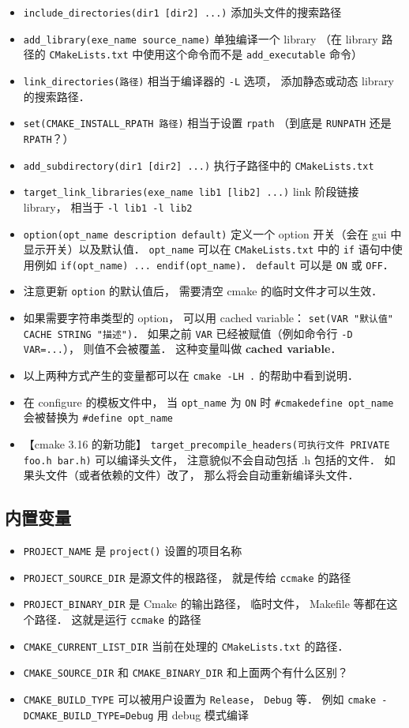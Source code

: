 \begin{itemize}
\item \verb`include_directories(dir1 [dir2] ...)` 添加头文件的搜索路径
\item \verb`add_library(exe_name source_name)` 单独编译一个 library （在 library 路径的 \verb|CMakeLists.txt| 中使用这个命令而不是 \verb`add_executable` 命令）
\item \verb|link_directories(路径)| 相当于编译器的 \verb`-L` 选项， 添加静态或动态 library 的搜索路径．
\item \verb|set(CMAKE_INSTALL_RPATH 路径)| 相当于设置 \verb|rpath| （到底是 \verb|RUNPATH| 还是 \verb|RPATH|？）
\item \verb`add_subdirectory(dir1 [dir2] ...)` 执行子路径中的 \verb|CMakeLists.txt|
\item \verb`target_link_libraries(exe_name lib1 [lib2] ...)` link 阶段链接 library， 相当于 \verb|-l lib1 -l lib2|
\item \verb`option(opt_name description default)` 定义一个 option 开关（会在 gui 中显示开关）以及默认值． \verb`opt_name` 可以在 \verb|CMakeLists.txt| 中的 \verb`if` 语句中使用例如 \verb`if(opt_name) ... endif(opt_name)`． \verb`default` 可以是 \verb`ON` 或 \verb`OFF`．
\item 注意更新 \verb|option| 的默认值后， 需要清空 cmake 的临时文件才可以生效．
\item 如果需要字符串类型的 option， 可以用 cached variable： \verb|set(VAR "默认值" CACHE STRING "描述")|． 如果之前 \verb|VAR| 已经被赋值（例如命令行 \verb|-D VAR=...|）， 则值不会被覆盖． 这种变量叫做 \textbf{cached variable}．
\item 以上两种方式产生的变量都可以在 \verb|cmake -LH .| 的帮助中看到说明．
\item 在 configure 的模板文件中， 当 \verb`opt_name` 为 \verb`ON` 时 \verb`#cmakedefine opt_name` 会被替换为 \verb`#define opt_name`
\item 【cmake 3.16 的新功能】 \verb|target_precompile_headers(可执行文件 PRIVATE foo.h bar.h)| 可以编译头文件， 注意貌似不会自动包括 .h 包括的文件． 如果头文件（或者依赖的文件）改了， 那么将会自动重新编译头文件．
\end{itemize}

\subsection{内置变量}
\begin{itemize}
\item \verb|PROJECT_NAME| 是 \verb|project()| 设置的项目名称
\item \verb`PROJECT_SOURCE_DIR` 是源文件的根路径， 就是传给 \verb`ccmake` 的路径
\item \verb`PROJECT_BINARY_DIR` 是 Cmake 的输出路径， 临时文件， Makefile 等都在这个路径． 这就是运行 \verb`ccmake` 的路径
\item \verb|CMAKE_CURRENT_LIST_DIR| 当前在处理的 \verb|CMakeLists.txt| 的路径．
\item \verb|CMAKE_SOURCE_DIR| 和 \verb|CMAKE_BINARY_DIR| 和上面两个有什么区别？
\item \verb|CMAKE_BUILD_TYPE| 可以被用户设置为 \verb|Release|， \verb|Debug| 等． 例如 \verb|cmake -DCMAKE_BUILD_TYPE=Debug| 用 debug 模式编译
\end{itemize}


